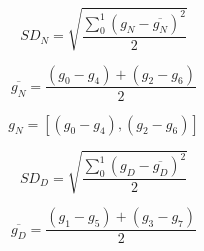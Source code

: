 \documentclass[12pt,a4paper]{jihmsp}
\begin{document}
{{%

\begin{equation}
SD_N=\sqrt{\frac{\sum_0^1(g_N-\overline{g_N})^2}{2}}
\end{equation}


\begin{equation}
\overline{g_{N}}=\frac{(g_{0}-g_{4})+(g_{2}-g_{6})}{2} 
\end{equation}


\begin{equation}
g_{N}=[(g_{0}-g_{4}),(g_{2}-g_{6})]
\end{equation}


\begin{equation}
SD_D=\sqrt{\frac{\sum_0^1(g_D-\overline{g_D})^2}{2}}
\end{equation}


\begin{equation}
\overline{g_{D}}=\frac{(g_{1}-g_{5})+(g_{3}-g_{7})}{2} 
\end{equation}

}}
\end{document}
